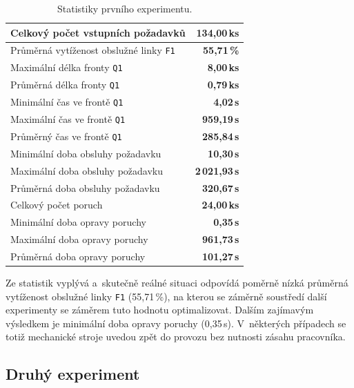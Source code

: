 \documentclass[a4paper, 11pt]{article}
\begin{document}
\begin{table}[ht!]
    \centering
    \begin{tabular}{|l|r|}
        \hline
        Celkový počet vstupních požadavků & \textbf{134,00\,ks} \\ \hline
        Průměrná vytíženost obslužné linky \texttt{F1} & \textbf{55,71\,\%} \\ \hline
        Maximální délka fronty \texttt{Q1} & \textbf{8,00\,ks} \\ \hline
        Průměrná délka fronty \texttt{Q1} & \textbf{0,79\,ks} \\ \hline
        Minimální čas ve frontě \texttt{Q1} & \textbf{4,02\,s} \\ \hline
        Maximální čas ve frontě \texttt{Q1} & \textbf{959,19\,s} \\ \hline
        Průměrný čas ve frontě \texttt{Q1} & \textbf{285,84\,s} \\ \hline
        Minimální doba obsluhy požadavku & \textbf{10,30\,s} \\ \hline
        Maximální doba obsluhy požadavku & \textbf{2\,021,93\,s} \\ \hline
        Průměrná doba obsluhy požadavku & \textbf{320,67\,s} \\ \hline
        Celkový počet poruch & \textbf{24,00\,ks} \\ \hline
        Minimální doba opravy poruchy & \textbf{0,35\,s} \\ \hline
        Maximální doba opravy poruchy & \textbf{961,73\,s} \\ \hline
        Průměrná doba opravy poruchy & \textbf{101,27\,s} \\ \hline
    \end{tabular}
    \caption{Statistiky prvního experimentu.}
    \label{FirstExperiment}
\end{table}

Ze statistik vyplývá a~skutečně reálné situaci odpovídá poměrně nízká průměrná vytíženost obslužné linky \texttt{F1} (55,71\,\%), na kterou se záměrně soustředí další experimenty se záměrem tuto hodnotu optimalizovat.
Dalším zajímavým výsledkem je minimální doba opravy poruchy (0,35\,s).
V~některých případech se totiž mechanické stroje uvedou zpět do provozu bez nutnosti zásahu pracovníka.

\subsection{Druhý experiment}
\end{document}
